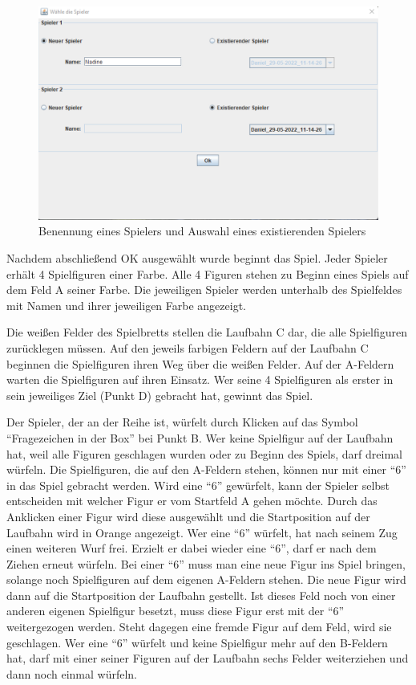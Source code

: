 \begin{figure}[htbp]
\centering
\centerline{\includegraphics[scale=.6]{anleitung4}}
\caption{Benennung eines Spielers und Auswahl eines existierenden Spielers}
\label{fig:anleitung4}
\end{figure}

\noindent Nachdem abschließend OK ausgewählt wurde beginnt das Spiel. Jeder Spieler erhält 4 Spielfiguren einer Farbe. Alle 4 Figuren stehen zu Beginn eines Spiels auf dem Feld A seiner Farbe. Die jeweiligen Spieler werden unterhalb des Spielfeldes mit Namen und ihrer jeweiligen Farbe angezeigt.

Die weißen Felder des Spielbretts stellen die Laufbahn C dar, die alle Spielfiguren zurücklegen müssen. Auf den jeweils farbigen Feldern auf der Laufbahn C beginnen die Spielfiguren ihren Weg über die weißen Felder. Auf der A-Feldern warten die Spielfiguren auf ihren Einsatz. Wer seine 4 Spielfiguren als erster in sein jeweiliges Ziel (Punkt D) gebracht hat, gewinnt das Spiel.

\newpage

\noindent Der Spieler, der an der Reihe ist, würfelt durch Klicken auf das Symbol \enquote{Fragezeichen in der Box} bei Punkt B. Wer keine Spielfigur auf der Laufbahn hat, weil alle Figuren geschlagen wurden oder zu Beginn des Spiels, darf dreimal würfeln. Die Spielfiguren, die auf den A-Feldern stehen, können nur mit einer \enquote{6} in das Spiel gebracht werden. Wird eine \enquote{6} gewürfelt, kann der Spieler selbst entscheiden mit welcher Figur er vom Startfeld A gehen möchte. Durch das Anklicken einer Figur wird diese ausgewählt und die Startposition auf der Laufbahn wird in Orange angezeigt. Wer eine \enquote{6} würfelt, hat nach seinem Zug einen weiteren Wurf frei. Erzielt er dabei wieder eine \enquote{6}, darf er nach dem Ziehen erneut würfeln. Bei einer \enquote{6} muss man eine neue Figur ins Spiel bringen, solange noch Spielfiguren auf dem eigenen A-Feldern stehen. Die neue Figur wird dann auf die Startposition der Laufbahn gestellt. Ist dieses Feld noch von einer anderen eigenen Spielfigur besetzt, muss diese Figur erst mit der \enquote{6} weitergezogen werden. Steht dagegen eine fremde Figur auf dem Feld, wird sie geschlagen. Wer eine \enquote{6} würfelt und keine Spielfigur mehr auf den B-Feldern hat, darf mit einer seiner Figuren auf der Laufbahn sechs Felder weiterziehen und dann noch einmal würfeln.


